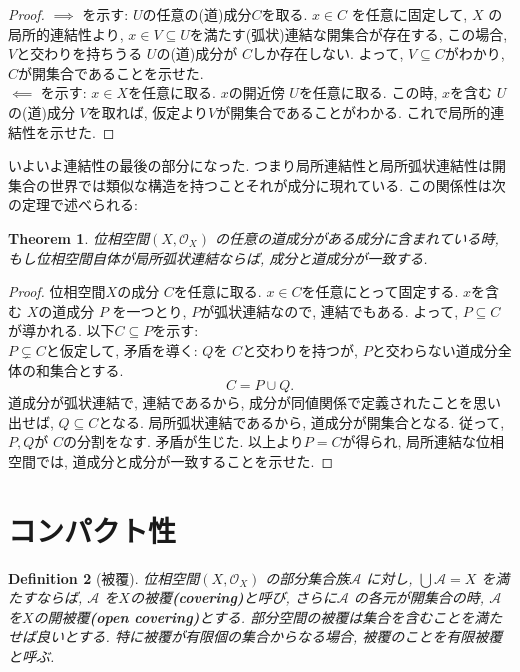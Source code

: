 \documentclass[lualatex]{ltjsbook}
\newtheorem{theorem}{Theorem}[chapter]
\newtheorem{definition}[theorem]{Definition}
\theoremstyle{remark}
\theoremstyle{plain}
\begin{document}
\begin{proof}
	$\implies$ を示す:
	$U$の任意の(道)成分$C$を取る. $x \in C$ を任意に固定して,  
	$X$ の局所的連結性より,  $x \in V \subseteq U$を満たす(弧状)連結な開集合が存在する,  
	この場合,  $V$と交わりを持ちうる $U$の(道)成分が $C$しか存在しない. 
	よって,   $V \subseteq C$がわかり,  $C$が開集合であることを示せた.\\
	$ \impliedby$ を示す: 
	 $x \in  X$を任意に取る. $x$の開近傍 $U$を任意に取る.
	 この時,  $x$を含む $U$の(道)成分 $V$を取れば, 
	 仮定より$V$が開集合であることがわかる. これで局所的連結性を示せた.
\end{proof}

いよいよ連結性の最後の部分になった. つまり局所連結性と局所弧状連結性は開集合の世界では類似な構造を持つことそれが成分に現れている. この関係性は次の定理で述べられる: 

\begin{theorem}
	位相空間$\left( X ,  \mathcal{O}_{X} \right)$ の任意の道成分がある成分に含まれている時,  
	もし位相空間自体が局所弧状連結ならば,  成分と道成分が一致する.
\end{theorem}

\begin{proof}
	位相空間$X$の成分 $C$を任意に取る. 
	$x \in C $を任意にとって固定する. 
	$x$を含む $X$の道成分 $P$ を一つとり,  $P$が弧状連結なので,  連結でもある.
	よって,   $P \subseteq C$が導かれる. 以下$C \subseteq P$を示す: \\
	$P \subsetneq C $と仮定して,  矛盾を導く:
	$Q$を $C$と交わりを持つが,   $P$と交わらない道成分全体の和集合とする. 
	 \[
	C=P \cup Q
	.\]
	道成分が弧状連結で,  連結であるから,  成分が同値関係で定義されたことを思い出せば,  $Q\subseteq C$となる.
	局所弧状連結であるから,  道成分が開集合となる. 従って,   $P, Q$が $C$の分割をなす. 矛盾が生じた.
	以上より$P=C$が得られ,  局所連結な位相空間では,  道成分と成分が一致することを示せた. 
\end{proof}

\section{コンパクト性}

\begin{definition}[被覆]
	位相空間$\left( X ,  \mathcal{O}_{X} \right)$ の部分集合族$\mathcal{A}$ に対し,  $ \bigcup \mathcal{A} = X$ を満たすならば,  $\mathcal{A}$ を$X$の被覆\textbf{(covering)}と呼び,   さらに$\mathcal{A}$ の各元が開集合の時,  $\mathcal{A}$ を$X$の開被覆\textbf{(open covering)}とする. 部分空間の被覆は集合を含むことを満たせば良いとする. 特に被覆が有限個の集合からなる場合,  被覆のことを有限被覆と呼ぶ.
\end{definition}
\end{document}
